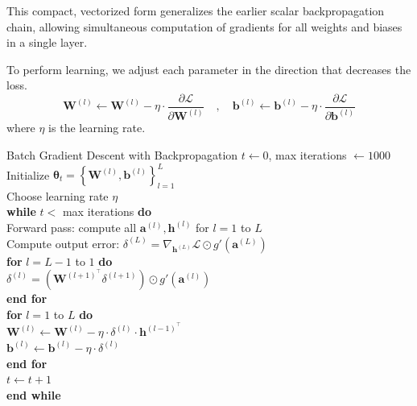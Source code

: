 This compact, vectorized form generalizes the earlier scalar backpropagation chain, allowing simultaneous computation of gradients for all weights and biases in a single layer.

To perform learning, we adjust each parameter in the direction that decreases the loss.
\[
\mathbf{W}^{(l)} \gets \mathbf{W}^{(l)} - \eta \cdot \frac{\partial \mathcal{L}}{\partial \mathbf{W}^{(l)}}
\quad , \quad
\mathbf{b}^{(l)} \gets \mathbf{b}^{(l)} - \eta \cdot \frac{\partial \mathcal{L}}{\partial \mathbf{b}^{(l)}}
\]
where \( \eta \) is the learning rate. 

\begin{algobox}{Batch Gradient Descent with Backpropagation}
\( t \gets 0 \), max iterations \( \gets 1000 \) \\
Initialize \( \boldsymbol{\theta}_t = \left\{ \mathbf{W}^{(l)}, \mathbf{b}^{(l)} \right\}_{l=1}^L \) \\
Choose learning rate \( \eta \) \\

\textbf{while} \( t < \) max iterations \textbf{do} \\
\hspace*{1em} Forward pass: compute all \( \mathbf{a}^{(l)}, \mathbf{h}^{(l)} \) for \( l = 1 \) to \( L \) \\
\hspace*{1em} Compute output error: \( \delta^{(L)} = \nabla_{\mathbf{h}^{(L)}} \mathcal{L} \odot g'(\mathbf{a}^{(L)}) \) \\

\hspace*{1em} \textbf{for} \( l = L-1 \) to \( 1 \) \textbf{do} \\
\hspace*{2em} \( \delta^{(l)} = \left( \mathbf{W}^{(l+1)^\top} \delta^{(l+1)} \right) \odot g'(\mathbf{a}^{(l)}) \) \\
\hspace*{1em} \textbf{end for} \\

\hspace*{1em} \textbf{for} \( l = 1 \) to \( L \) \textbf{do} \\
\hspace*{2em} \( \mathbf{W}^{(l)} \gets \mathbf{W}^{(l)} - \eta \cdot \delta^{(l)} \cdot \mathbf{h}^{(l-1)^\top} \) \\
\hspace*{2em} \( \mathbf{b}^{(l)} \gets \mathbf{b}^{(l)} - \eta \cdot \delta^{(l)} \) \\
\hspace*{1em} \textbf{end for} \\
\hspace*{1em} \( t \gets t + 1 \) \\
\textbf{end while}
\end{algobox}
\vspace{5pt}


